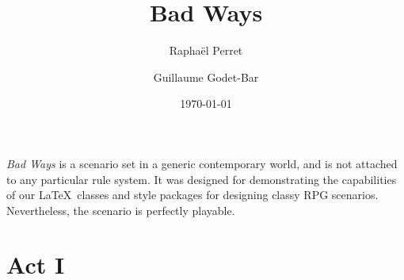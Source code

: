 \documentclass{rpg_scenario}
\title{Bad Ways}
\date{\today}
\begin{document}
\author{Rapha\"el Perret \and Guillaume Godet-Bar}
\maketitle


\textit{Bad Ways} is a scenario set in a generic contemporary world, and is not
attached to any particular rule system. It was designed for demonstrating the
capabilities of our \LaTeX\ classes and style packages for designing classy RPG
scenarios. Nevertheless, the scenario is perfectly playable.








\section{Act I}













\end{document}
